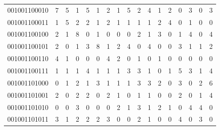 \documentclass[10pt,a4paper]{article}
\begin{document}
\begin{longtable}{ |c|c|c|c|c|c|c|c|c|c|c|c|c|c|c|c|c| }
    001001100010              & 7                            & 5                                & 1                            & 5                              & 1   & 2   & 1   & 5   & 2   & 4   & 1   & 2   & 0   & 3   & 0   & 3   \\
    001001100011              & 1                            & 5                                & 2                            & 2                              & 1   & 2   & 1   & 1   & 1   & 1   & 2   & 4   & 0   & 1   & 0   & 0   \\
    001001100100              & 2                            & 1                                & 8                            & 0                              & 1   & 0   & 0   & 0   & 2   & 1   & 3   & 0   & 1   & 4   & 0   & 4   \\
    001001100101              & 2                            & 0                                & 1                            & 3                              & 8   & 1   & 2   & 4   & 0   & 4   & 0   & 0   & 3   & 1   & 1   & 2   \\
    001001100110              & 4                            & 1                                & 0                            & 0                              & 0   & 4   & 2   & 0   & 1   & 0   & 1   & 0   & 0   & 0   & 0   & 0   \\
    001001100111              & 1                            & 1                                & 1                            & 4                              & 1   & 1   & 1   & 3   & 3   & 1   & 0   & 1   & 5   & 3   & 1   & 4   \\
    001001101000              & 0                            & 1                                & 2                            & 1                              & 3   & 1   & 1   & 1   & 3   & 3   & 2   & 0   & 3   & 0   & 2   & 6   \\
    001001101001              & 2                            & 0                                & 2                            & 2                              & 0   & 2   & 1   & 0   & 1   & 1   & 0   & 0   & 2   & 0   & 1   & 4   \\
    001001101010              & 0                            & 0                                & 3                            & 0                              & 0   & 0   & 2   & 1   & 3   & 1   & 2   & 1   & 0   & 4   & 4   & 0   \\
    001001101011              & 3                            & 1                                & 2                            & 2                              & 2   & 3   & 0   & 0   & 2   & 1   & 0   & 0   & 4   & 0   & 3   & 0   \\

\end{longtable}
\end{document}
